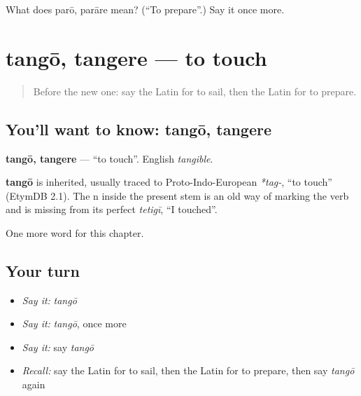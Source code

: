 \begin{tcolorbox}[breakable,colback=teal!4,colframe=teal!35!black,title={Before you move on}]
What does parō, parāre mean? (\textquotedblleft{}To prepare\textquotedblright{}.) Say it once more.
\end{tcolorbox}
\section[tangō, tangere]{tangō, tangere — to touch}

\label{lesson:LA-C100-tango}



\begin{quote}
Before the new one: say the Latin for to sail, then the Latin for to prepare.
\end{quote}

\subsection*{You'll want to know: tangō, tangere}
\textbf{tangō, tangere} — \textquotedblleft{}to touch\textquotedblright{}. English \emph{tangible}.

\begin{cousinweb}
\textbf{tangō} is inherited, usually traced to Proto-Indo-European \emph{*tag-}, \textquotedblleft{}to touch\textquotedblright{} (EtymDB 2.1). The n inside the present stem is an old way of marking the verb and is missing from its perfect \emph{tetigī}, \textquotedblleft{}I touched\textquotedblright{}.
\end{cousinweb}

\begin{grammarlens}[title={What you've built}]
One more word for this chapter.
\end{grammarlens}

\subsection*{Your turn}
\begin{itemize}
\raggedright
  \item \emph{Say it:} \emph{tangō}
  \item \emph{Say it:} \emph{tangō}, once more
  \item \emph{Say it:} say \emph{tangō}
  \item \emph{Recall:} say the Latin for to sail, then the Latin for to prepare, then say \emph{tangō} again
\end{itemize}

